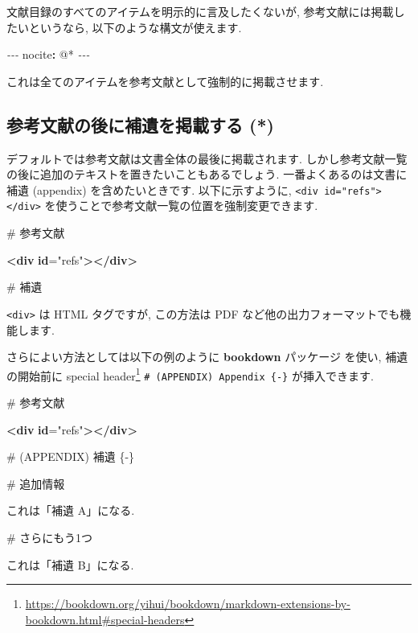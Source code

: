 \documentclass[
  11pt,
  lualatex,ja=standard,jafont=noto]{bxjsreport}
\newenvironment{Shaded}{\begin{snugshade}}{\end{snugshade}}
\newcommand{\AttributeTok}[1]{\textcolor[rgb]{0.77,0.63,0.00}{#1}}
\newcommand{\ErrorTok}[1]{\textcolor[rgb]{0.64,0.00,0.00}{\textbf{#1}}}
\newcommand{\FunctionTok}[1]{\textcolor[rgb]{0.00,0.00,0.00}{#1}}
\newcommand{\KeywordTok}[1]{\textcolor[rgb]{0.13,0.29,0.53}{\textbf{#1}}}
\newcommand{\NormalTok}[1]{#1}
\newcommand{\OtherTok}[1]{\textcolor[rgb]{0.56,0.35,0.01}{#1}}
\newcommand{\PreprocessorTok}[1]{\textcolor[rgb]{0.56,0.35,0.01}{\textit{#1}}}
\newcommand{\StringTok}[1]{\textcolor[rgb]{0.31,0.60,0.02}{#1}}
\renewcommand{\href}[2]{#2\footnote{\url{#1}}}
\begin{document}
文献目録のすべてのアイテムを明示的に言及したくないが, 参考文献には掲載したいというなら, 以下のような構文が使えます.

\begin{Shaded}
\begin{Highlighting}[]
\PreprocessorTok{{-}{-}{-}}
\FunctionTok{nocite}\KeywordTok{:}\AttributeTok{ }\StringTok{\textquotesingle{}@*\textquotesingle{}}
\PreprocessorTok{{-}{-}{-}}
\end{Highlighting}
\end{Shaded}

これは全てのアイテムを参考文献として強制的に掲載させます.

\hypertarget{include-appendix-after-bibliography}{%
\subsection{参考文献の後に補遺を掲載する (*)}\label{include-appendix-after-bibliography}}

デフォルトでは参考文献は文書全体の最後に掲載されます. しかし参考文献一覧の後に追加のテキストを置きたいこともあるでしょう. 一番よくあるのは文書に補遺 (appendix) を含めたいときです. 以下に示すように, \texttt{\textless{}div\ id="refs"\textgreater{}\textless{}/div\textgreater{}} を使うことで参考文献一覧の位置を強制変更できます.

\begin{Shaded}
\begin{Highlighting}[]
\FunctionTok{\# 参考文献}

\KeywordTok{\textless{}div} \ErrorTok{id}\OtherTok{=}\StringTok{"refs"}\KeywordTok{\textgreater{}\textless{}/div\textgreater{}}

\FunctionTok{\# 補遺}
\end{Highlighting}
\end{Shaded}

\texttt{\textless{}div\textgreater{}} は HTML タグですが, この方法は PDF など他の出力フォーマットでも機能します.

さらによい方法としては以下の例のように \textbf{bookdown} パッケージ \autocite{R-bookdown} を使い, 補遺の開始前に \href{https://bookdown.org/yihui/bookdown/markdown-extensions-by-bookdown.html\#special-headers}{special header} \texttt{\# (APPENDIX) Appendix \{-\}} が挿入できます.

\begin{Shaded}
\begin{Highlighting}[]
\FunctionTok{\# 参考文献}

\KeywordTok{\textless{}div} \ErrorTok{id}\OtherTok{=}\StringTok{"refs"}\KeywordTok{\textgreater{}\textless{}/div\textgreater{}}

\FunctionTok{\# (APPENDIX) 補遺 \{{-}\} }

\FunctionTok{\# 追加情報}

\NormalTok{これは「補遺 A」になる.}

\FunctionTok{\# さらにもう1つ}

\NormalTok{これは「補遺 B」になる.}
\end{Highlighting}
\end{Shaded}
\end{document}
